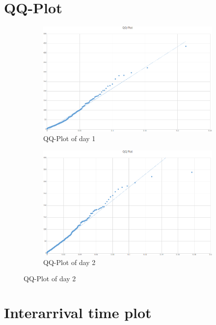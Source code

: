 \documentclass{article}
\begin{document}
\section{QQ-Plot}

\begin{figure}[H]
    \begin{subfigure}{0.5\textwidth}
        \includegraphics[width=\linewidth]{day1-qqplot.png}
        \caption{QQ-Plot of day 1}
    \end{subfigure}
    \begin{subfigure}{0.5\textwidth}
        \includegraphics[width=\linewidth]{day2-qqplot.png}
        \caption{QQ-Plot of day 2}
    \end{subfigure}
\end{figure}


\section{Interarrival time plot}
\end{document}
